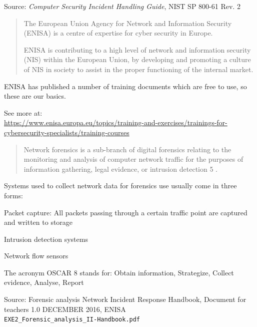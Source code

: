 \documentclass[Screen16to9,17pt]{foils}
\begin{document}
Source: \emph{Computer Security Incident Handling Guide}, NIST SP 800-61 Rev. 2



\begin{quote}
  The European Union Agency for Network and Information Security (ENISA) is a centre of expertise for cyber security in Europe.

ENISA is contributing to a high level of network and information security (NIS) within the European Union, by developing and promoting a culture of NIS in society to assist in the proper functioning of the internal market.
\end{quote}


ENISA has published a number of training documents which are free to use, so these are our basics.

See more at:\\{\footnotesize
\url{https://www.enisa.europa.eu/topics/training-and-exercises/trainings-for-cybersecurity-specialists/training-courses}}


\begin{quote}
Network forensics is a sub-branch of digital forensics relating to the monitoring and analysis of computer
network traffic for the purposes of information gathering, legal evidence, or intrusion detection 5 .
\end{quote}

\begin{list1}
\item Systems used to collect network data for forensics use usually come in three forms:
\begin{list2}
\item Packet capture: All packets passing through a certain traffic point are captured and written to storage
\item Intrusion detection systems
\item Network flow sensors
\end{list2}
\end{list1}

The acronym OSCAR 8 stands for: Obtain information,
Strategize,
Collect evidence,
Analyse,
Report

Source: Forensic analysis Network Incident Response Handbook, Document for teachers 1.0 DECEMBER 2016, ENISA\\
\verb+EXE2_Forensic_analysis_II-Handbook.pdf+
\end{document}

